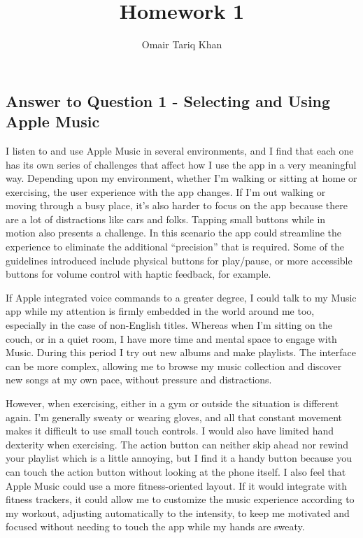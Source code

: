 \documentclass[
	letterpaper, %
]{jdf}
\author{Omair Tariq Khan}
\title{Homework 1}
\begin{document}

\maketitle
\hfill \break
\hfill \break


\subsection{Answer to Question 1 - Selecting and Using Apple Music}
I listen to and use Apple Music in several environments, and I find that each one has its own series of challenges that affect how I use the app in a very meaningful way. Depending upon my environment, whether I’m walking or sitting at home or exercising, the user experience with the app changes. If I’m out walking or moving through a busy place, it’s also harder to focus on the app because there are a lot of distractions like cars and folks. Tapping small buttons while in motion also presents a challenge. In this scenario the app could streamline the experience to eliminate the additional “precision” that is required. Some of the guidelines introduced include physical buttons for play/pause, or more accessible buttons for volume control with haptic feedback, for example.

If Apple integrated voice commands to a greater degree, I could talk to my Music app while my attention is firmly embedded in the world around me too, especially in the case of non-English titles. Whereas when I’m sitting on the couch, or in a quiet room, I have more time and mental space to engage with Music. During this period I try out new albums and make playlists. The interface can be more complex, allowing me to browse my music collection and discover new songs at my own pace, without pressure and distractions.

However, when exercising, either in a gym or outside the situation is different again. I’m generally sweaty or wearing gloves, and all that constant movement makes it difficult to use small touch controls. I would also have limited hand dexterity when exercising. The action button can neither skip ahead nor rewind your playlist which is a little annoying, but I find it a handy button because you can touch the action button without looking at the phone itself. I also feel that Apple Music could use a more fitness-oriented layout. If it would integrate with fitness trackers, it could allow me to customize the music experience according to my workout, adjusting automatically to the intensity, to keep me motivated and focused without needing to touch the app while my hands are sweaty.
\end{document}
